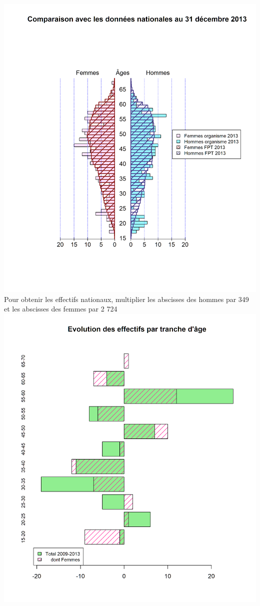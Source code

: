 \includegraphics{altair_files/figure-latex/unnamed-chunk-11-2.png} Pour
obtenir les effectifs nationaux, multiplier les abscisses des hommes par
349 et les abscisses des femmes par 2 724\newpage
\includegraphics{altair_files/figure-latex/unnamed-chunk-11-3.png}

